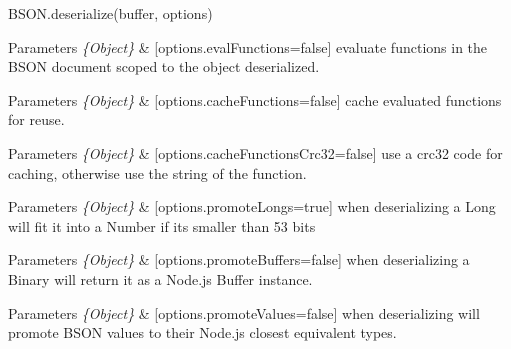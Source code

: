 \begin{DoxyItemize}
\item {\ttfamily B\+S\+O\+N.\+deserialize(buffer, options)}
\begin{DoxyItemize}
\item 
\begin{DoxyParams}{Parameters}
{\em \{\+Object\}} & \mbox{[}options.\+eval\+Functions=false\mbox{]} evaluate functions in the B\+S\+ON document scoped to the object deserialized.\\
\hline
\end{DoxyParams}

\item 
\begin{DoxyParams}{Parameters}
{\em \{\+Object\}} & \mbox{[}options.\+cache\+Functions=false\mbox{]} cache evaluated functions for reuse.\\
\hline
\end{DoxyParams}

\item 
\begin{DoxyParams}{Parameters}
{\em \{\+Object\}} & \mbox{[}options.\+cache\+Functions\+Crc32=false\mbox{]} use a crc32 code for caching, otherwise use the string of the function.\\
\hline
\end{DoxyParams}

\item 
\begin{DoxyParams}{Parameters}
{\em \{\+Object\}} & \mbox{[}options.\+promote\+Longs=true\mbox{]} when deserializing a Long will fit it into a Number if it\textquotesingle{}s smaller than 53 bits\\
\hline
\end{DoxyParams}

\item 
\begin{DoxyParams}{Parameters}
{\em \{\+Object\}} & \mbox{[}options.\+promote\+Buffers=false\mbox{]} when deserializing a Binary will return it as a Node.\+js Buffer instance.\\
\hline
\end{DoxyParams}

\item 
\begin{DoxyParams}{Parameters}
{\em \{\+Object\}} & \mbox{[}options.\+promote\+Values=false\mbox{]} when deserializing will promote B\+S\+ON values to their Node.\+js closest equivalent types.\\
\hline
\end{DoxyParams}


\end{DoxyItemize}
\end{DoxyItemize}
